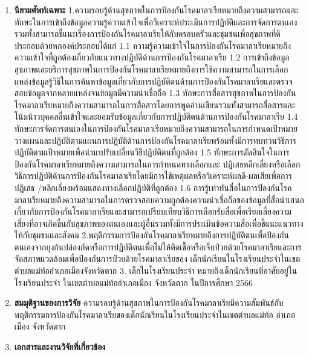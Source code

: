\begin{titlepage}
\begin{enumerate}
    \item\textbf{นิยามศัพท์เฉพาะ}
    1.ความรอบรู้ด้านสุขภาพในการป้องกันโรคมาลาเรียหมายถึงความสามารถและทักษะในการเข้าถึงข้อมูลความรู้ความเข้าใจเพื่อวิเคราะห์ประเมินการปฏิบัติและการจัดการตนเองรวมทั้งสามารถชี้แนะเรื่องการป้องกันโรคมาลาเรียให้กับครอบครัวและชุมชนเพื่อสุขภาพที่ดีประกอบด้วยหกองค์ประกอบได้แก่
1.1 ความรู้ความเข้าใจในการป้องกันโรคมาลาเรียหมายถึงความเข้าใจที่ถูกต้องเกี่ยวกับแนวทางปฏิบัติด้านการป้องกันโรคมาลาเรีย
1.2 การเข้าถึงข้อมูลสุขภาพและบริการสุขภาพในการป้องกันโรคมาลาเรียหมายถึงการใช้ความสามารถในการเลือกแหล่งข้อมูลรู้วิธีในการค้นหาข้อมูลเกี่ยวกับการปฏิบัติตนด้านการป้องกันโรคมาลาเรียและตรวจสอบข้อมูลจากหลายแหล่งจนข้อมูลมีความน่าเชื่อถือ 
1.3 ทักษะการสื่อสารสุขภาพในการป้องกันโรคมาลาเรียหมายถึงความสามารถในการสื่อสารโดยการพูดอ่านเขียนรวมทั้งสามารถสื่อสารและโน้มน้าวบุคคลอื่นเข้าใจและยอมรับข้อมูลเกี่ยวกับการปฏิบัติตนด้านการป้องกันโรคมาลาเรีย
1.4 ทักษะการจัดการตนเองในการป้องกันโรคมาลาเรียหมายถึงความสามารถในการกำหนดเป้าหมายวางแผนและปฏิบัติตามแผนการปฎิบัติด้านการป้องกันโรคมาลาเรียพร้อมทั้งมีการทบทวนวิธีการปฏิบัติตามเป้าหมายเพื่อนำมาปรับเปลี่ยนวิธีปฏิบัติตนที่ถูกต้อง
1.5 ทักษะการตัดสินใจในการป้องกันโรคมาลาเรียหมายถึงความสามารถในการกำหนดทางเลือกและ ปฏิเสธหลีกเลี่ยงหรือเลือกวิธีการปฏิบัติด้านการป้องกันโรคมาลาเรียโดยมีการใช้เหตุผลหรือวิเคราะห์ผลดี-ผลเสียเพื่อการปฏิเสธ /หลีกเลี่ยงพร้อมแสดงทางเลือกปฏิบัติที่ถูกต้อง
1.6 การรู้เท่าทันสื่อในการป้องกันโรคมาลาเรียหมายถึงความสามารถในการตรวจสอบความถูกต้องความน่าเชื่อถือของข้อมูลที่สื่อนำเสนอเกี่ยวกับการป้องกันโรคมาลาเรียและสามารถเปรียบเทียบวิธีการเลือกรับสื่อเพื่อเรียกเลี่ยงความเสี่ยงที่อาจเกิดขึ้นกับสุขภาพของตนเองและผู้อื่นรวมทั้งมีการประเมินข้อความสื่อเพื่อชี้แนะแนวทางให้กับชุมชนและสังคม
2.พฤติกรรมการป้องกันโรคมาลาเรียหมายถึงการปฏิบัติตนเพื่อป้องกันตนเองจากยุงก้นปล่องกัดหรือการปฏิบัติตนเพื่อไม่ให้ติดเชื้อหรือเจ็บป่วยด้วยโรคมาลาเรียและการจัดสภาพแวดล้อมเพื่อป้องกันการป่วยด้วยโรคมาลาเรียของ เด็กนักเรียนในโรงเรียนประจำในเขตตำบลแม่ท้ออำเภอเมืองจังหวัดตาก
3. เด็กในโรงเรียนประจำ หมายถึงเด็กนักเรียนที่อาศัยอยู่ในโรงเรียนประจำ ในเขตตำบลแม่ท้ออำเภอเมือง จังหวัดตาก ในปีการศึกษา 2566
    \lipsum[1-1]

    \item\textbf{สมมุติฐานของการวิจัย}
    ความรอบรู้ด้านสุขภาพในการป้องกันโรคมาลาเรียมีความสัมพันธ์กับพฤติกรรมการป้องกันโรคมาลาเรียของเด็กนักเรียนในโรงเรียนประจำในเขตตำบลแม่ท้อ อำเภอเมือง จังหวัดตาก
    \lipsum[1-1]

    \item\textbf{เอกสารและงานวิจัยที่เกี่ยวข้อง}
    
    \lipsum[1-1]


\end{enumerate}
\end{titlepage}
